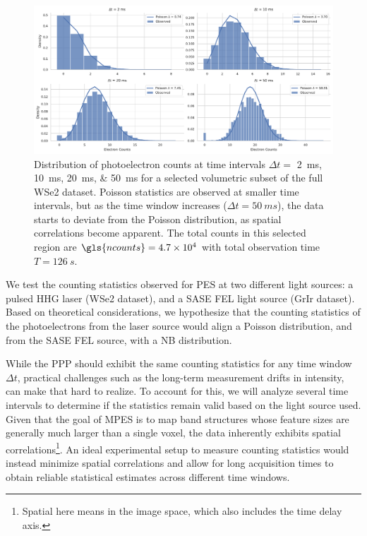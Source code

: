 \begin{figure}
    \centering
    \includegraphics[width=1\linewidth]{images/hist_counts_facetgrid_1_wse2.pdf}
    \caption{Distribution of photoelectron counts at time intervals $\Delta t =$ \qtylist{2;10;20;50}{ms} for a selected volumetric subset of the full \gls{WSe2} dataset. Poisson statistics are observed at smaller time intervals, but as the time window increases ($\Delta t = \qty{50}{ms}$), the data starts to deviate from the Poisson distribution, as spatial correlations become apparent. The total counts in this selected region are $\gls{ncounts}=\num{4.7e4}$ with total observation time $T=\qty{126}{s}$.}
    \label{fig:wse2-stats}
\end{figure}

We test the counting statistics observed for \gls{PES} at two different light sources: a pulsed \gls{HHG} laser (\gls{WSe2} dataset), and a \gls{SASE} \gls{FEL} light source (\gls{GrIr} dataset). Based on theoretical considerations, we hypothesize that the counting statistics of the photoelectrons from the laser source would align a Poisson distribution, and from the \gls{SASE} \gls{FEL} source, with a \gls{NB} distribution. 

While the \gls{PPP} should exhibit the same counting statistics for any time window $\Delta t$, practical challenges such as the long-term measurement drifts in intensity, can make that hard to realize. To account for this, we will analyze several time intervals to determine if the statistics remain valid based on the light source used. Given that the goal of \gls{MPES} is to map band structures whose feature sizes are generally much larger than a single voxel, the data inherently exhibits spatial correlations\footnote{Spatial here means in the image space, which also includes the time delay axis.}. An ideal experimental setup to measure counting statistics would instead minimize spatial correlations and allow for long acquisition times to obtain reliable statistical estimates across different time windows.

